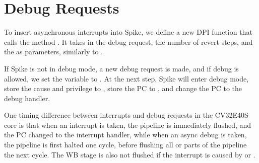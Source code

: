 \section{Debug Requests}


To insert asynchronous interrupts into Spike, we define a new DPI function  that calls the method . It takes in the debug request, the number of revert steps, and the  as parameters, similarly to . 

If Spike is not in debug mode, a new debug request is made, and if debug is allowed, we set the  variable to . At the next step, Spike will enter debug mode, store the cause and privilege to , store the PC to , and change the PC to the debug handler.

One timing difference between interrupts and debug requests in the CV32E40S core is that when an interrupt is taken, the pipeline is immediately flushed, and the PC changed to the interrupt handler, while when an async debug is taken, the pipeline is first halted one cycle, before flushing all or parts of the pipeline the next cycle. The WB stage is also not flushed if the interrupt is caused by  or .



